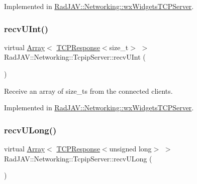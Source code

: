 Implemented in \mbox{\hyperlink{class_rad_j_a_v_1_1_networking_1_1wx_widgets_t_c_p_server_ae2987d75bd2abf728af2fab7f336b344}{Rad\+J\+A\+V\+::\+Networking\+::wx\+Widgets\+T\+C\+P\+Server}}.

\mbox{\label{class_rad_j_a_v_1_1_networking_1_1_tcpip_server_a359e1dbd9da88ae4f04ea9441c635518}} 
\subsubsection{\texorpdfstring{recv\+U\+Int()}{recvUInt()}}
{\footnotesize\ttfamily virtual \mbox{\hyperlink{class_rad_j_a_v_1_1_array}{Array}}$<$ \mbox{\hyperlink{class_rad_j_a_v_1_1_networking_1_1_t_c_p_response}{T\+C\+P\+Response}}$<$size\+\_\+t$>$ $>$ Rad\+J\+A\+V\+::\+Networking\+::\+Tcpip\+Server\+::recv\+U\+Int (\begin{DoxyParamCaption}{ }\end{DoxyParamCaption})\hspace{0.3cm}{\ttfamily [pure virtual]}}



Receive an array of size\+\_\+ts from the connected clients. 



Implemented in \mbox{\hyperlink{class_rad_j_a_v_1_1_networking_1_1wx_widgets_t_c_p_server_a129c677e9e61fc1ce3fe09d42306d27d}{Rad\+J\+A\+V\+::\+Networking\+::wx\+Widgets\+T\+C\+P\+Server}}.

\mbox{\label{class_rad_j_a_v_1_1_networking_1_1_tcpip_server_a09ecfe6df6b363f17670f0dc6b52cbdd}} 
\subsubsection{\texorpdfstring{recv\+U\+Long()}{recvULong()}}
{\footnotesize\ttfamily virtual \mbox{\hyperlink{class_rad_j_a_v_1_1_array}{Array}}$<$ \mbox{\hyperlink{class_rad_j_a_v_1_1_networking_1_1_t_c_p_response}{T\+C\+P\+Response}}$<$unsigned long$>$ $>$ Rad\+J\+A\+V\+::\+Networking\+::\+Tcpip\+Server\+::recv\+U\+Long (\begin{DoxyParamCaption}{ }\end{DoxyParamCaption})\hspace{0.3cm}{\ttfamily [pure virtual]}}



